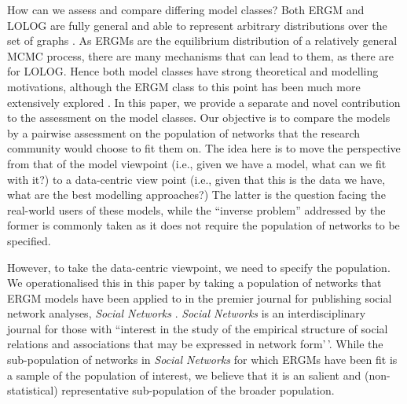 \documentclass[
]{statsoc}
\begin{document}
How can we assess and compare differing model classes? Both ERGM and
LOLOG are fully general and able to represent arbitrary distributions
over the set of graphs \citep[][Theorem 1]{Fellows2018}. As ERGMs are
the equilibrium distribution of a relatively general MCMC process, there
are many mechanisms that can lead to them, as there are for LOLOG. Hence
both model classes have strong theoretical and modelling motivations,
although the ERGM class to this point has been much more extensively
explored \citep{schweinberger2020,Schweinberger2017ExponentialFamilyMO}.
In this paper, we provide a separate and novel contribution to the
assessment on the model classes. Our objective is to compare the models
by a pairwise assessment on the population of networks that the research
community would choose to fit them on. The idea here is to move the
perspective from that of the model viewpoint (i.e., given we have a
model, what can we fit with it?) to a data-centric view point (i.e.,
given that this is the data we have, what are the best modelling
approaches?) The latter is the question facing the real-world users of
these models, while the ``inverse problem'' addressed by the former is
commonly taken as it does not require the population of networks to be
specified.

However, to take the data-centric viewpoint, we need to specify the
population. We operationalised this in this paper by taking a population
of networks that ERGM models have been applied to in the premier journal
for publishing social network analyses, \textit{Social Networks}
\citep{socialnetworks}. \textit{Social Networks} is an interdisciplinary
journal for those with ``interest in the study of the empirical
structure of social relations and associations that may be expressed in
network form'\,'. While the sub-population of networks in
\textit{Social Networks} for which ERGMs have been fit is a sample of
the population of interest, we believe that it is an salient and
(non-statistical) representative sub-population of the broader
population.
\end{document}
